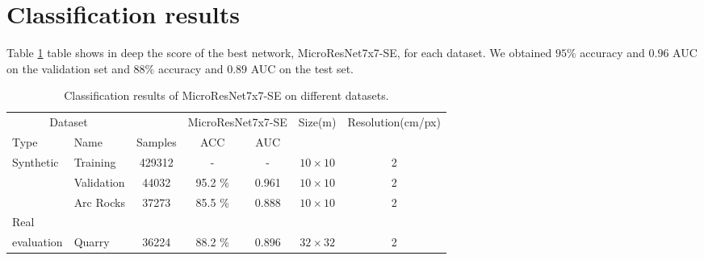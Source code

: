 \documentclass[../document.tex]{subfiles}
\begin{document}
\section{Classification results}
Table \ref{tab : classification-results} table shows in deep the score of the best network, MicroResNet7x7-SE, for each dataset. We obtained $95\%$ accuracy and $0.96$ AUC on the validation set and $88\%$ accuracy and $0.89$ AUC on the test set.
\begin{table}[htbp]
    \centering
    \begin{tabular}{@{}llccccc@{}}
    \toprule
    \multicolumn{2}{c}{Dataset} && \multicolumn{2}{c}{MicroResNet7x7-SE} & Size(m) & Resolution(cm/px) \\
    \cmidrule{1-2} \cmidrule{4-5}
    Type     &  Name  & Samples & ACC  &  AUC    & & \\
    \toprule
      \multirow{3}{*}{Synthetic}  & Training   & 429312 & - & - & $10\times10$ & 2\\
      &  Validation   & 44032 &  95.2 \% &  0.961 & $10\times10$ & 2 \\
      & Arc Rocks & 37273 &  85.5 \% &  0.888 & $10\times10$ & 2 \\
      \cmidrule{2-7}
    Real\\evaluation & Quarry & 36224 &  88.2 \%&  0.896& $32\times32$ & 2\\
    \bottomrule   
\end{tabular}
\caption{Classification results of MicroResNet7x7-SE on different datasets.}
\label{tab : classification-results}
\end{table}
\end{document}

